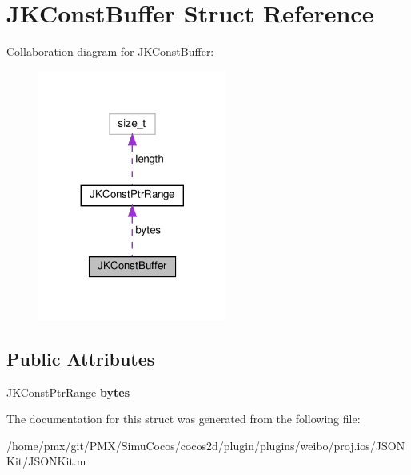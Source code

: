 \hypertarget{structJKConstBuffer}{}\section{J\+K\+Const\+Buffer Struct Reference}
\label{structJKConstBuffer}


Collaboration diagram for J\+K\+Const\+Buffer\+:
\nopagebreak
\begin{figure}[H]
\begin{center}
\leavevmode
\includegraphics[width=176pt]{structJKConstBuffer__coll__graph}
\end{center}
\end{figure}
\subsection*{Public Attributes}
\begin{DoxyCompactItemize}
\item 
\mbox{\label{structJKConstBuffer_ac9eed12dee7b6758b0672a86ba4d1e73}} 
\hyperlink{structJKConstPtrRange}{J\+K\+Const\+Ptr\+Range} {\bfseries bytes}
\end{DoxyCompactItemize}


The documentation for this struct was generated from the following file\+:\begin{DoxyCompactItemize}
\item 
/home/pmx/git/\+P\+M\+X/\+Simu\+Cocos/cocos2d/plugin/plugins/weibo/proj.\+ios/\+J\+S\+O\+N\+Kit/J\+S\+O\+N\+Kit.\+m\end{DoxyCompactItemize}
